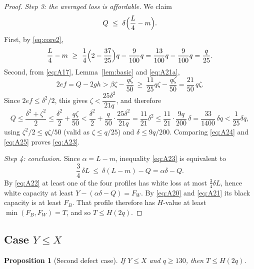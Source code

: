 \documentclass[11pt]{amsart}
\newtheorem{proposition}[theorem]{Proposition}
\theoremstyle{definition}
\theoremstyle{remark}
\begin{document}
\begin{proof}
\emph{Step 3: the averaged loss is affordable.} We claim
\begin{equation}\label{eq:A23}
Q\ \le\ \delta\Bigl(\frac L4-m\Bigr).
\end{equation}
First, by \eqref{eq:core2},
\begin{equation}\label{eq:A24}
\frac L4-m\ \ge\ \frac14\Bigl(2-\frac{37}{25}\Bigr)q-\frac9{100}q=\frac{13}{100}q-\frac{9}{100}q=\frac q{25}.
\end{equation}
Second, from \eqref{eq:A17}, Lemma~\ref{lem:basic} and \eqref{eq:A21a},
\[
2ef=Q-2gh>\beta\zeta-\frac{q\zeta}{50}\ \ge\ \frac{11}{25}q\zeta-\frac{q\zeta}{50}=\frac{21}{50}\,q\zeta .
\]
Since $2ef\le\delta^2/2$, this gives $\zeta<\dfrac{25\delta^2}{21q}$, and therefore
\begin{equation}\label{eq:A25}
Q\le\frac{\delta^2+\zeta^2}{2}\le\frac{\delta^2}{2}+\frac{q\zeta}{50}<\frac{\delta^2}{2}+\frac{q}{50}\cdot\frac{25\delta^2}{21q}=\frac{11}{21}\delta^2\le\frac{11}{21}\cdot\frac{9q}{200}\,\delta=\frac{33}{1400}\,\delta q<\frac{1}{25}\delta q ,
\end{equation}
using $\zeta^2/2\le q\zeta/50$ (valid as $\zeta\le q/25$) and $\delta\le9q/200$. Comparing \eqref{eq:A24} and \eqref{eq:A25} proves \eqref{eq:A23}.

\emph{Step 4: conclusion.} Since $\alpha=L-m$, inequality \eqref{eq:A23} is equivalent to
\begin{equation}\label{eq:A26}
\frac34\,\delta L\ \le\ \delta(L-m)-Q=\alpha\delta-Q .
\end{equation}
By \eqref{eq:A22} at least one of the four profiles has white loss at most $\frac34\delta L$, hence white capacity at least $Y-(\alpha\delta-Q)=F_W$. By \eqref{eq:A20} and \eqref{eq:A21} its black capacity is at least $F_B$. That profile therefore has $H$-value at least $\min(F_B,F_W)=T$, and so $T\le H(2q)$.
\end{proof}

\subsection{Case \texorpdfstring{$Y\le X$}{Y <= X}}\label{ssec:caseB}

\begin{proposition}[Second defect case]\label{prop:caseB}
If $Y\le X$ and $q\ge130$, then $T\le H(2q)$.
\end{proposition}
\end{document}
